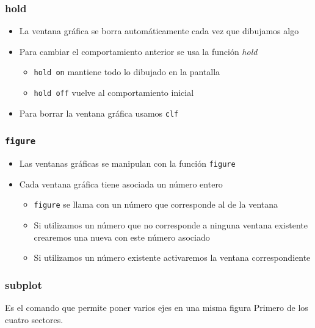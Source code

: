 \documentclass[12pt]{beamer}
\begin{document}
\begin{large}
\begin{frame}
\frametitle{hold}
\begin{itemize}
\item La ventana gráfica se borra automáticamente cada vez que
  dibujamos algo
\item Para cambiar el comportamiento anterior se usa la función
  \emph{hold}
  \begin{itemize}
    \item \texttt{hold on} mantiene todo lo dibujado en la pantalla
    \item \texttt{hold off} vuelve al comportamiento inicial
  \end{itemize}
  \item Para borrar la ventana gráfica usamos \texttt{clf}
\end{itemize}
\end{frame}

\begin{frame}
\frametitle{\texttt{figure}}
\begin{itemize}
\item Las ventanas gráficas se manipulan con la función
  \texttt{figure}
\item Cada ventana gráfica tiene asociada un número entero
  \begin{itemize}
    \item \texttt{figure} se llama con un número que corresponde al de
      la ventana
    \item Si utilizamos un número que no corresponde a ninguna ventana
      existente crearemos una nueva con este número asociado
    \item Si utilizamos un número existente activaremos la ventana
      correspondiente
  \end{itemize}
\end{itemize}
\end{frame}

\begin{frame}
  \frametitle{subplot}
  Es el comando que permite poner varios ejes en una misma figura
\testcode
Primero de los cuatro sectores.
\end{frame}


\end{large}
\end{document}
